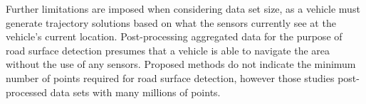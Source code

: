 \documentclass[journal,onecolumn]{IEEEtran}
\begin{document}
%	
	{Further limitations are imposed when considering data set size, as a vehicle must generate trajectory solutions based on what the sensors currently see at the vehicle's current location. Post-processing aggregated data for the purpose of road surface detection presumes that a vehicle is able to navigate the area without the use of any sensors. Proposed methods \cite{yadav_extraction_2017,yadav_road_2018,yadav_rural_2018,yadav_pole-shaped_2015,miyazaki_line-based_2014,yang_semi-automated_2013,liu_new_2013,qiu_fast_2016} do not indicate the minimum number of points required for road surface detection, however those studies post-processed data sets with many millions of points.}
\end{document}
